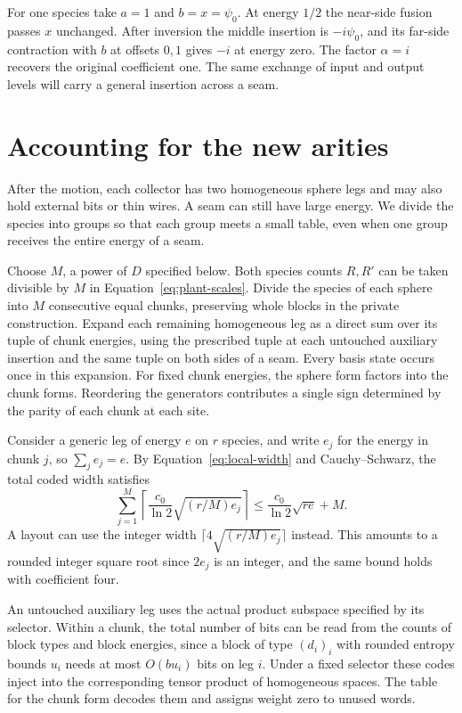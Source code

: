 For one species take \(a=1\) and \(b=x=\psi_0\). At energy
\(1/2\) the near-side fusion passes \(x\) unchanged. After inversion the
middle insertion is \(-i\psi_0\), and its far-side contraction with
\(b\) at offsets \(0,1\) gives \(-i\) at energy zero. The factor
\(\alpha=i\) recovers the original coefficient one. The same exchange
of input and output levels will carry a general insertion across a seam.




\section{Accounting for the new arities}\label{subsec:local-output}


After the motion, each collector has two homogeneous sphere legs and may
also hold external bits or thin wires. A seam can still have large energy.
We divide the species into groups so that each group meets a small table,
even when one group receives the entire energy of a seam.

Choose \(M\), a power of \(D\) specified below. Both species counts
\(R,R'\) can be taken divisible by \(M\) in
Equation~\eqref{eq:plant-scales}. Divide the species of each sphere
into \(M\) consecutive equal chunks, preserving whole blocks in the
private construction. Expand each remaining homogeneous leg as a
direct sum over its tuple of chunk energies, using the prescribed tuple
at each untouched auxiliary insertion and the same tuple on both sides
of a seam. Every basis state occurs once in this expansion. For fixed
chunk energies, the sphere form factors into the chunk forms.
Reordering the generators contributes a single sign determined by the
parity of each chunk at each site.

Consider a generic leg of energy \(e\) on \(r\) species, and write
\(e_j\) for the energy in chunk \(j\), so \(\sum_j e_j=e\).
By Equation~\eqref{eq:local-width} and Cauchy--Schwarz, the total
coded width satisfies
\begin{equation}\label{eq:local-chunk-size}
 \sum_{j=1}^M\left\lceil\frac{c_0}{\ln 2}\sqrt{(r/M)e_j}\right\rceil
 \le \frac{c_0}{\ln 2}\sqrt{r e}+M .
\end{equation}
A layout can use the integer width \(\lceil4\sqrt{(r/M)e_j}\rceil\)
instead. This amounts to a rounded integer square root since \(2e_j\)
is an integer, and the same bound holds with coefficient four.

An untouched auxiliary
leg uses the actual product subspace specified by its selector. Within a
chunk, the total number of bits can be read from the counts of block types
and block energies, since a block of type \((d_i)_i\) with rounded entropy bounds
\(u_i\) needs at most \(O(bu_i)\) bits on leg \(i\). Under a fixed selector these codes inject
into the corresponding tensor product of homogeneous spaces. The table
for the chunk form decodes them and assigns weight zero to unused words.

